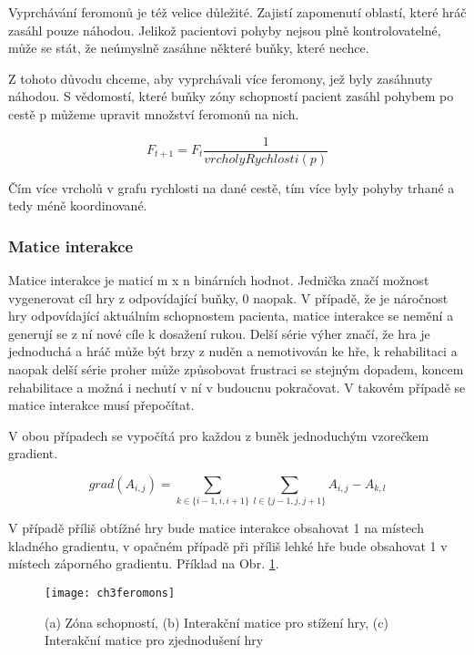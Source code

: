 Vyprchávání feromonů je též velice důležité. Zajistí zapomenutí oblastí, které hráč zasáhl pouze náhodou. Jelikož pacientovi pohyby nejsou plně kontrolovatelné, může se stát, že neúmyslně zasáhne některé buňky, které nechce.

Z tohoto důvodu chceme, aby vyprchávali více feromony, jež byly zasáhnuty náhodou. S vědomostí, které buňky zóny schopností pacient zasáhl pohybem po cestě p můžeme upravit množství feromonů na nich.

\begin{equation}
	F_{t+1} = F_t\frac{1}{vrcholyRychlosti(p)}
\end{equation}

Čím více vrcholů v grafu rychlosti na dané cestě, tím více byly pohyby trhané a tedy méně koordinované.

\subsubsection{Matice interakce}

Matice interakce je maticí m x n binárních hodnot. Jednička značí možnost vygenerovat cíl hry z odpovídající buňky, 0 naopak. V případě, že je náročnost hry odpovídající aktuálním schopnostem pacienta, matice interakce se nemění a generují se z ní nové cíle k dosažení rukou. Delší série výher značí, že hra je jednoduchá a hráč může být brzy z nuděn a nemotivován ke hře, k rehabilitaci a naopak delší série proher může způsobovat frustraci se stejným dopadem, koncem rehabilitace a možná i nechutí v ní v budoucnu pokračovat. V takovém případě se matice interakce musí přepočítat.

V obou případech se vypočítá pro každou z buněk jednoduchým vzorečkem gradient.

\begin{equation}
	grad(A_{i,j}) = \sum_{k \in \{i-1, i, i+1\}} \sum_{l \in \{j-1, j, j+1\}} A_{i, j} - A_{k, l}
\end{equation}

V případě příliš obtížné hry bude matice interakce obsahovat 1 na místech kladného gradientu, v opačném případě při příliš lehké hře bude obsahovat 1 v místech záporného gradientu. Příklad na Obr. \ref{fig-ch3feromons}.

\begin{figure}
  \centering
  \texttt{[image: ch3feromons]}
	\caption{(a) Zóna schopností, (b) Interakční matice pro stížení hry, (c) Interakční matice pro zjednodušení hry \cite{26poststroke} }
	\label{fig-ch3feromons}
\end{figure}

